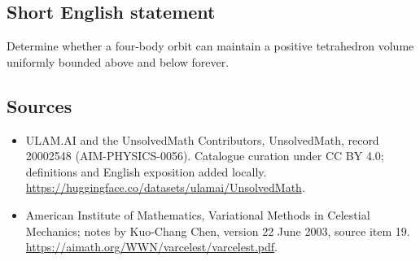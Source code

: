 \documentclass[11pt]{article}
\begin{document}
\subsection{Short English statement}
Determine whether a four-body orbit can maintain a positive tetrahedron volume uniformly bounded above and below forever.
\subsection{Sources}
\begin{itemize}
\item[\hypertarget{source:20002548:1}{S1}] ULAM.AI and the UnsolvedMath Contributors, UnsolvedMath, record 20002548 (AIM-PHYSICS-0056). Catalogue curation under CC BY 4.0; definitions and English exposition added locally.
\url{https://huggingface.co/datasets/ulamai/UnsolvedMath}.
\item[\hypertarget{source:20002548:2}{S2}] American Institute of Mathematics, Variational Methods in Celestial Mechanics; notes by Kuo-Chang Chen, version 22 June 2003, source item 19.
\url{https://aimath.org/WWN/varcelest/varcelest.pdf}.
\end{itemize}
\label{end:20002548}
\end{document}
